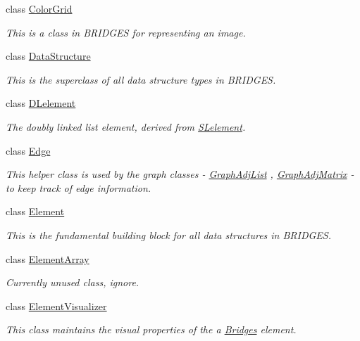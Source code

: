 \begin{DoxyCompactItemize}
class \mbox{\hyperlink{classbridges_1_1datastructure_1_1_color_grid}{Color\+Grid}}
\begin{DoxyCompactList}\small\item\em This is a class in B\+R\+I\+D\+G\+ES for representing an image. \end{DoxyCompactList}\item 
class \mbox{\hyperlink{classbridges_1_1datastructure_1_1_data_structure}{Data\+Structure}}
\begin{DoxyCompactList}\small\item\em This is the superclass of all data structure types in B\+R\+I\+D\+G\+ES. \end{DoxyCompactList}\item 
class \mbox{\hyperlink{classbridges_1_1datastructure_1_1_d_lelement}{D\+Lelement}}
\begin{DoxyCompactList}\small\item\em The doubly linked list element, derived from \mbox{\hyperlink{classbridges_1_1datastructure_1_1_s_lelement}{S\+Lelement}}. \end{DoxyCompactList}\item 
class \mbox{\hyperlink{classbridges_1_1datastructure_1_1_edge}{Edge}}
\begin{DoxyCompactList}\small\item\em This helper class is used by the graph classes -\/ \mbox{\hyperlink{classbridges_1_1datastructure_1_1_graph_adj_list}{Graph\+Adj\+List}} , \mbox{\hyperlink{classbridges_1_1datastructure_1_1_graph_adj_matrix}{Graph\+Adj\+Matrix}} -\/ to keep track of edge information. \end{DoxyCompactList}\item 
class \mbox{\hyperlink{classbridges_1_1datastructure_1_1_element}{Element}}
\begin{DoxyCompactList}\small\item\em This is the fundamental building block for all data structures in B\+R\+I\+D\+G\+ES. \end{DoxyCompactList}\item 
class \mbox{\hyperlink{classbridges_1_1datastructure_1_1_element_array}{Element\+Array}}
\begin{DoxyCompactList}\small\item\em Currently unused class, ignore. \end{DoxyCompactList}\item 
class \mbox{\hyperlink{classbridges_1_1datastructure_1_1_element_visualizer}{Element\+Visualizer}}
\begin{DoxyCompactList}\small\item\em This class maintains the visual properties of the a \mbox{\hyperlink{classbridges_1_1_bridges}{Bridges}} element. \end{DoxyCompactList}\item 

\end{DoxyCompactItemize}
